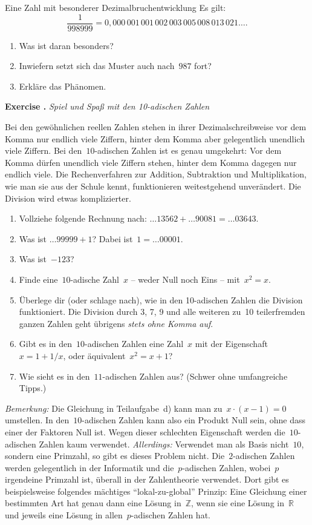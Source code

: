 \documentclass[a4paper,english,twoside]{scrartcl}
\newlength{\aufgabenskip}
\newcounter{aufgabennummer}
\newenvironment{aufgabe}[1]{
  \refstepcounter{aufgabennummer}
  \textbf{Exercise \theaufgabennummer.} \emph{#1} \par
}{\vspace{\aufgabenskip}}
\newenvironment{aufgabe*}[1]{
  \refstepcounter{aufgabennummer}
  \textbf{Exercise* \theaufgabennummer.} \emph{#1} \par
}{\vspace{\aufgabenskip}}
\begin{document}
\begin{aufgabe*}{Eine Zahl mit besonderer Dezimalbruchentwicklung}
Es gilt:
\[ \frac{1}{998999} =
  0{,}000\,001\,001\,002\,003\,005\,008\,013\,021\ldots. \]
\begin{enumerate}
\item Was ist daran besonders?
\item Inwiefern setzt sich das Muster auch nach~$987$ fort?
\item Erkläre das Phänomen.
\end{enumerate}
\end{aufgabe*}

\begin{aufgabe}{Spiel und Spaß mit den 10-adischen Zahlen}
Bei den gewöhnlichen reellen Zahlen stehen in ihrer Dezimalschreibweise vor dem
Komma nur endlich viele Ziffern, hinter dem Komma aber gelegentlich unendlich
viele Ziffern. Bei den~$10$-adischen Zahlen ist es genau umgekehrt: Vor dem
Komma dürfen unendlich viele Ziffern stehen, hinter dem Komma dagegen nur
endlich viele. Die Rechenverfahren zur Addition, Subtraktion und
Multiplikation, wie man sie aus der Schule kennt, funktionieren weitestgehend
unverändert. Die Division wird etwas komplizierter.
\begin{enumerate}
\item Vollziehe folgende Rechnung nach:
$\ldots 13562 + \ldots 90081 = \ldots 03643$.
\item Was ist $\ldots 99999 + 1$? Dabei ist~$1 = \ldots 00001$.
\item Was ist~$-123$?
\item Finde eine~$10$-adische Zahl~$x$ -- weder Null noch Eins -- mit~$x^2 = x$.
\item Überlege dir (oder schlage nach), wie in den 10-adischen Zahlen die
Division funktioniert. Die Division durch 3, 7, 9 und alle weiteren zu~10
teilerfremden ganzen Zahlen geht übrigens \emph{stets ohne Komma auf}.
\item Gibt es in den~$10$-adischen Zahlen eine Zahl~$x$ mit der
Eigenschaft~$x = 1 + 1/x$, oder äquivalent~$x^2 = x + 1$?
\item Wie sieht es in den~$11$-adischen Zahlen aus? (Schwer ohne umfangreiche
Tipps.)
\end{enumerate}
{\scriptsize
\emph{Bemerkung:} Die Gleichung in Teilaufgabe~d) kann man zu~$x \cdot (x-1) =
0$ umstellen. In den~$10$-adischen Zahlen kann also ein Produkt Null sein, ohne
dass einer der Faktoren Null ist. Wegen dieser schlechten Eigenschaft werden
die~$10$-adischen Zahlen kaum verwendet. \emph{Allerdings:} Verwendet man als
Basis nicht~$10$, sondern eine Primzahl, so gibt es dieses Problem nicht.
Die~$2$-adischen Zahlen werden gelegentlich in der Informatik und
die~$p$-adischen Zahlen, wobei~$p$ irgendeine Primzahl ist, überall in der
Zahlentheorie verwendet. Dort gibt es beispielsweise folgendes mächtiges
"`lokal-zu-global"' Prinzip: Eine Gleichung einer bestimmten Art hat genau dann
eine Lösung in~$\mathbb{Z}$, wenn sie eine Lösung in~$\mathbb{R}$ und jeweils
eine Lösung in allen~$p$-adischen Zahlen hat.\par}
\end{aufgabe}
\end{document}
